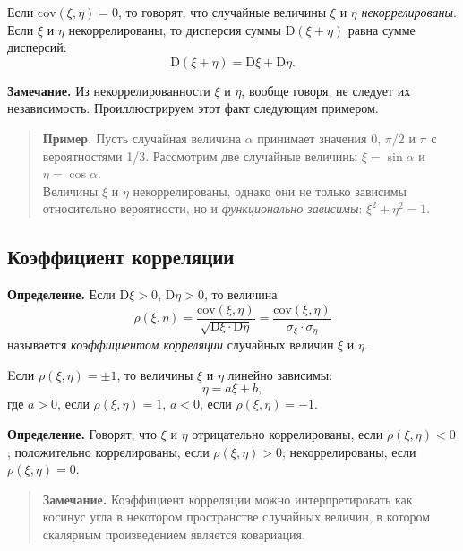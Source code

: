 \documentclass[11pt,a4paper]{article}
\begin{document}
Если \(\mathrm{cov}\left( \xi, \eta \right) = 0\), то говорят, что
случайные величины \(\xi\) и \(\eta\) \emph{некоррелированы}.\\
Если \(\xi\) и \(\eta\) некоррелированы, то дисперсия суммы
\(\mathrm{D}(\xi+\eta)\) равна сумме дисперсий:
\[ \mathrm{D}(\xi+\eta) = \mathrm{D}\xi + \mathrm{D}\eta. \]

\textbf{Замечание.} Из некоррелированности \(\xi\) и \(\eta\), вообще
говоря, не следует их независимость. Проиллюстрируем этот факт следующим
примером.

\begin{quote}
\textbf{Пример.} Пусть случайная величина \(\alpha\) принимает значения
0, \(\pi/2\) и \(\pi\) с вероятностями 1/3. Рассмотрим две случайные
величины \(\xi = \sin \alpha\) и \(\eta = \cos \alpha\).\\
Величины \(\xi\) и \(\eta\) некоррелированы, однако они не только
зависимы относительно вероятности, но и \emph{функционально зависимы}:
\(\xi^2 + \eta^2 = 1\).
\end{quote}

    \hypertarget{ux43aux43eux44dux444ux444ux438ux446ux438ux435ux43dux442-ux43aux43eux440ux440ux435ux43bux44fux446ux438ux438}{%
\subsection{Коэффициент
корреляции}\label{ux43aux43eux44dux444ux444ux438ux446ux438ux435ux43dux442-ux43aux43eux440ux440ux435ux43bux44fux446ux438ux438}}

\textbf{Определение.} Если \(\mathrm{D}\xi > 0\),
\(\mathrm{D}\eta > 0\), то величина \[
    \rho(\xi, \eta) = \dfrac{\mathrm{cov}(\xi, \eta)}{\sqrt{\mathrm{D}\xi \cdot \mathrm{D}\eta}} = \dfrac{\mathrm{cov}(\xi, \eta)}{\sigma_\xi \cdot \sigma_\eta}
\] называется \emph{коэффициентом корреляции} случайных величин \(\xi\)
и \(\eta\).

Eсли \(\rho(\xi, \eta) = \pm 1\), то величины \(\xi\) и \(\eta\) линейно
зависимы: \[ \eta =a \xi + b, \] где \(a>0\), если
\(\rho(\xi, \eta) = 1\), \(a<0\), если \(\rho(\xi, \eta) = -1\).

\textbf{Определение.} Говорят, что \(\xi\) и \(\eta\) отрицательно
коррелированы, если \(\rho(\xi, \eta) < 0\); положительно коррелированы,
если \(\rho(\xi, \eta) > 0\); некоррелированы, если
\(\rho(\xi, \eta) = 0\).

\begin{quote}
\textbf{Замечание.} Коэффициент корреляции можно интерпретировать как косинус угла в
некотором пространстве случайных величин, в котором скалярным
произведением является ковариация.
\end{quote}
\end{document}
